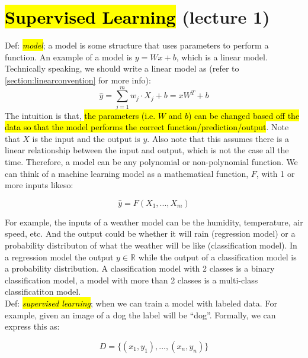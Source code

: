 \documentclass[11pt]{article}
\newcommand{\hlinfo}[1]{{\sethlcolor{lavender}\hl{#1}}}
\begin{document}
\noindent
\section*{}
\subsection*{}

\section{\hl{Supervised Learning} (lecture 1)}
Def: \hl{\emph{model}}; a model is some structure that uses parameters to perform a function. An example of a model is $y= Wx + b$, which is a linear model. Technically speaking, we should write a linear model as (refer to \ref{section:linearconvention} for more info):
\[\hat{y} = \sum_{j=1}^{m}{w_j \cdot X_j + b} = xW^{T} + b\]
The intuition is that, \hlinfo{the parameters (i.e. $W$ and $b$) can be changed based off the data so that the model performs the correct function/prediction/output}. Note that $X$ is the input and the output is $y$. Also note that this assumes there is a linear relationship between the input and output, which is not the case all the time. Therefore, a model can be any polynomial or non-polynomial function. We can think of a machine learning model as a mathematical function, $F$, with 1 or more inputs likeso:

\[\hat{y} = F(X_1, ..., X_m)\]

For example, the inputs of a weather model can be the humidity, temperature, air speed, etc. And the output could be whether it will rain (regression model) or a probability distributon of what the weather will be like (classification model). In a regression model the output $y \in \mathbb{R}$ while the output of a classification model is a probability distribution. A classification model with 2 classes is a binary classification model, a model with more than 2 classes is a multi-class classificatiton model. \\

Def: \hl{\emph{supervised learning}}; when we can train a model with labeled data. For example, given an image of a dog the label will be ``dog''. Formally, we can express this as:

\[D= \{(x_1, y_1), ..., (x_n, y_n)\}\]
\end{document}
